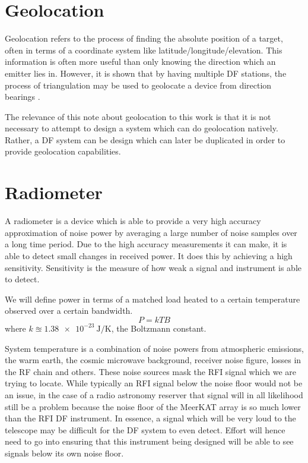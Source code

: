 \section{Geolocation}
Geolocation refers to the process of finding the absolute position of a target, often in terms of a coordinate system like latitude/longitude/elevation. This information is often more useful than only knowing the direction which an emitter lies in. However, it is shown that by having multiple DF stations, the process of triangulation may be used to geolocate a device from direction bearings \cite{poisel2012electronic}. 

The relevance of this note about geolocation to this work is that it is not necessary to attempt to design a system which can do geolocation natively. Rather, a DF system can be design which can later be duplicated in order to provide geolocation capabilities. 

\section{Radiometer}
A radiometer is a device which is able to provide a very high accuracy approximation of noise power by averaging a large number of noise samples over a long time period. Due to the high accuracy measurements it can make, it is able to detect small changes in received power. 
It does this by achieving a high sensitivity. Sensitivity is the measure of how weak a signal and instrument is able to detect.

We will define power in terms of a matched load heated to a certain temperature observed over a certain bandwidth.
\begin{equation}
  P = kTB
\end{equation}
where \(k \approxeq \SI{1.38e-23}{\joule\per\kelvin}\), the Boltzmann constant. 

System temperature is a combination of noise powers from atmospheric emissions, the warm earth, the cosmic microwave background, receiver noise figure, losses in the RF chain and others. These noise sources mask the RFI signal which we are trying to locate. While typically an RFI signal below the noise floor would not be an issue, in the case of a radio astronomy reserver that signal will in all likelihood still be a problem because the noise floor of the MeerKAT array is so much lower than the RFI DF instrument. In essence, a signal which will be very loud to the telescope may be difficult for the DF system to even detect. Effort will hence need to go into ensuring that this instrument being designed will be able to see signals below its own noise floor. 

